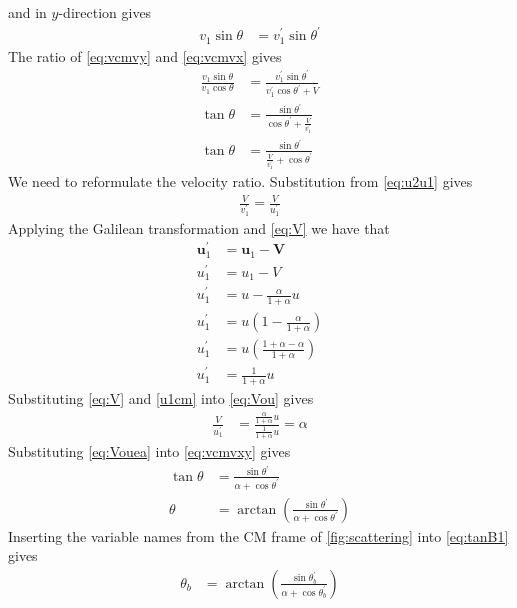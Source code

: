 \documentclass[twoside,english]{uiofysmaster/uiofysmaster}
\let\orgautoref\autoref
\renewcommand{\autoref}
        {%
		 \def\sectionautorefname{Section}%
		 \def\subsectionautorefname{Section}%
		 \def\subsubsectionautorefname{Section}%
		 \def\chapterautorefname{Chapter}%
          \orgautoref}
\begin{document}
\begin{appendices}
and in $y$-direction gives
\begin{align}\label{eq:vcmvy}
	v_1 \sin \theta &= v_1^{'} \sin \theta^{'}
\end{align}
The ratio of \autoref{eq:vcmvy} and \autoref{eq:vcmvx} gives
\begin{align}\label{eq:vcmvxy}
	\frac{v_1 \sin \theta}{v_1 \cos \theta} &= \frac{v_1^{'} \sin \theta^{'}}{v_1^{'} \cos \theta^{'} + V} \nonumber\\
	\tan \theta &= \frac{\sin \theta^{'}}{\cos \theta^{'} + \frac{V}{v_1^{'}}} \nonumber\\
	\tan \theta &= \frac{\sin \theta^{'}}{\frac{V}{v_1^{'}} + \cos \theta^{'}}
\end{align}
We need to reformulate the velocity ratio. 
Substitution from \autoref{eq:u2u1} gives
\begin{align}\label{eq:Vou}
	\frac{V}{v_1^{'}} = \frac{V}{u_1^{'}}
\end{align}
Applying the Galilean transformation and \autoref{eq:V} we have that
\begin{align}\label{u1cm}
	\boldsymbol{u}_1^{'} &= \boldsymbol{u}_1 - \boldsymbol{V} \nonumber\\
	u_1^{'} &= u_1 - V \nonumber\\
	u_1^{'} &= u - \frac{\alpha}{1 + \alpha} u \nonumber\\
	u_1^{'} &= u \left( 1 - \frac{\alpha}{1 + \alpha} \right) \nonumber\\
	u_1^{'} &= u \left( \frac{1 + \alpha - \alpha}{1 + \alpha} \right) \nonumber\\
	u_1^{'} &= \frac{1}{1 + \alpha} u
\end{align}
Substituting \autoref{eq:V} and \autoref{u1cm} into \autoref{eq:Vou} gives
\begin{align}\label{eq:Vouea}
	\frac{V}{u_1^{'}} &= \frac{\frac{\alpha}{1 + \alpha} u}{\frac{1}{1 + \alpha} u} = \alpha
\end{align}
Substituting \autoref{eq:Vouea} into \autoref{eq:vcmvxy} gives
\begin{align}\label{eq:tanB1}
	\tan \theta &= \frac{\sin \theta^{'}}{\alpha + \cos \theta^{'}}  \nonumber\\
	\theta &= \arctan \left( \frac{\sin \theta^{'}}{\alpha + \cos \theta^{'}} \right)
\end{align}
Inserting the variable names from the CM frame of \autoref{fig:scattering} into \autoref{eq:tanB1} gives
\begin{align}\label{eq:tanB1n}
	\theta_b &= \arctan \left( \frac{\sin \theta_b^{'}}{\alpha + \cos \theta_b^{'}} \right)
\end{align}


\end{appendices}
\end{document}

